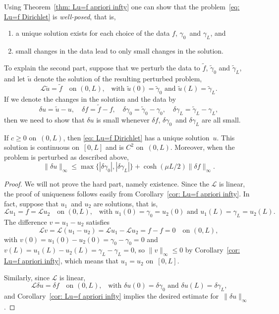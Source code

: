 Using Theorem~\ref{thm: Lu=f apriori infty} one can show that the 
problem~\eqref{eq: Lu=f Dirichlet} is \emph{well-posed}, that is,
\begin{enumerate}
\item a unique solution exists for each choice of the data $f$, $\gamma_0$~and 
$\gamma_L$, and 
\item small changes in the data lead to only small changes in the solution.
\end{enumerate}
To explain the second part, suppose that we perturb the data to $\tilde f$, 
$\tilde\gamma_0$ and $\tilde\gamma_L$, and let $\tilde u$ denote the solution 
of the resulting perturbed problem,
\[
\mathcal{L}\tilde u=\tilde f\quad\text{on $(0,L)$,}
	\quad\text{with $\tilde u(0)=\tilde\gamma_0$ 
and $\tilde u(L)=\tilde\gamma_L$.}
\]
If we denote the changes in the solution and the data by
\[
\delta u=\tilde u-u,\quad\delta f=\tilde f-f,\quad
\delta\gamma_0=\tilde\gamma_0-\gamma_0,\quad
\delta\gamma_L=\tilde\gamma_L-\gamma_L,
\]
then we need to show that $\delta u$ is small whenever $\delta f$, 
$\delta\gamma_0$~and $\delta\gamma_L$ are all small.

\begin{theorem}
If $c\ge0$ on~$(0,L)$, then \eqref{eq: Lu=f Dirichlet} has a unique 
solution~$u$.  This solution is continuous on~$[0,L]$ and is $C^2$ on~$(0,L)$.
Moreover, when the problem is perturbed as described above, 
\[
\|\delta u\|_\infty\le\max\{|\delta\gamma_0|,|\delta\gamma_L|\}
	+\cosh(\mu L/2)\|\delta f\|_\infty.
\]
\end{theorem}
\begin{proof}
We will not prove the hard part, namely existence.  Since the $\mathcal{L}$ is 
linear, the proof of uniqueness follows easily from 
Corollary~\ref{cor: Lu=f apriori infty}.  In fact, suppose that $u_1$~and $u_2$ 
are solutions, that is,
\[
\mathcal{L}u_1=f=\mathcal{L}u_2\quad\text{on $(0,L)$,}
	\quad\text{with $u_1(0)=\gamma_0=u_2(0)$ and $u_1(L)=\gamma_L=u_2(L)$.}
\]
The difference $v=u_1-u_2$ satisfies
\[
\mathcal{L}v=\mathcal{L}(u_1-u_2)=\mathcal{L}u_1-\mathcal{L}u_2=f-f=0
	\quad\text{on $(0,L)$},
\]
with $v(0)=u_1(0)-u_2(0)=\gamma_0-\gamma_0=0$ and
$v(L)=u_1(L)-u_2(L)=\gamma_L-\gamma_L=0$, so $\|v\|_\infty\le0$ by 
Corollary~\ref{cor: Lu=f apriori infty}, which means that $u_1=u_2$ on~$[0,L]$.

Similarly, since $\mathcal{L}$ is linear,
\[
\mathcal{L}\delta u=\delta f\quad\text{on $(0,L)$,}
	\quad\text{with $\delta u(0)=\delta\gamma_0$ 
and $\delta u(L)=\delta\gamma_L$,}
\]
and Corollary~\ref{cor: Lu=f apriori infty} implies the desired estimate 
for~$\|\delta u\|_\infty$.
\end{proof}

